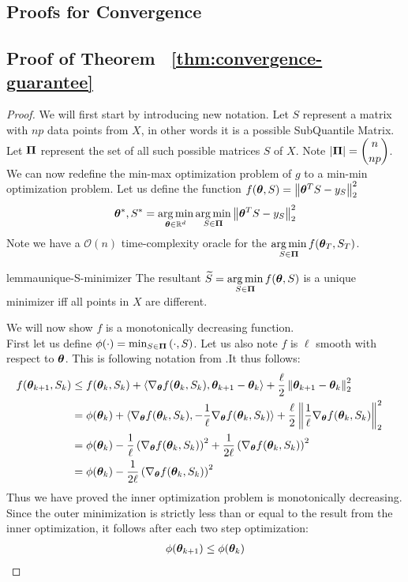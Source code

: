 \documentclass{article} %
\newcommand{\norm}[1]{\left\lVert#1\right\rVert}
\begin{document}
\begin{appendices}
	\newpage
	
	\section{Proofs for Convergence}
	\label{app:convergence-proofs}
	\subsection{Proof of Theorem ~\ref{thm:convergence-guarantee}}
	\begin{proof}
	We will first start by introducing new notation. Let $S$ represent a matrix with $np$ data points from $X$, in other words it is a possible SubQuantile Matrix. Let $\displaystyle{\bm{\Pi}}$ represent the set of all such possible matrices $S$ of $X$. Note $\displaystyle \left|{\bm{\Pi}}\right| = \binom{n}{np}$. We can now redefine the min-max optimization problem of $g$ to a min-min optimization problem. Let us define the function $f(\vtheta, S) = \norm{\vtheta^T S - y_S}_2^2$
	\begin{equation}
		\vtheta^*, S^* = \argmin_{\vtheta \in \mathbb{R}^d} \argmin_{S \in \vPi} \norm{\vtheta^T S - y_S}_2^2
	\end{equation}
	Note we have a $\mathcal{O}(n)$ time-complexity oracle for the $\displaystyle \operatorname*{arg\,min}_{S\in {\bm{\Pi}}}f({\bm{\theta}}_T,S_T)$. 
	\begin{restatable}{lemma}{unique-S-minimizer}
		\label{lem:unique-S-minimizer}
		The resultant $\displaystyle \widetilde{S} = \operatorname*{arg\,min}_{S \in {\bm{\Pi}}} f({\bm{\theta}},S)$ is a unique minimizer iff all points in $X$ are different. 
	\end{restatable}
	We will now show $f$ is a monotonically decreasing function.\\
	First let us define $\phi(\cdot) = \min_{S \in {\bm{\Pi}}}\left(\cdot,S\right)$. 
	Let us also note $f$ is $\ell$ smooth with respect to ${\bm{\theta}}$. This is following notation from \cite{Jin_2019}.It thus follows:
	\begin{align*}
		f(\vtheta_{k+1}, S_k) &\leq f(\vtheta_k, S_k) + \langle\nabla_\vtheta f(\vtheta_k,S_k), \vtheta_{k+1}-\vtheta_k \rangle + \frac{\ell}{2}\norm{\vtheta_{k+1}-\vtheta_k}_2^2 &&\\
		&= \phi(\vtheta_k) + \langle\nabla_\vtheta f(\vtheta_k,S_k), -\frac{1}{\ell}\nabla_\vtheta f(\vtheta_k,S_k)\rangle + \frac{\ell}{2}\norm{\frac{1}{\ell}\nabla_\vtheta f(\vtheta_k,S_k)}_2^2 &&\\
		&= \phi(\vtheta_k) - \frac{1}{\ell}\left(\nabla_\vtheta f(\vtheta_k,S_k)\right)^2 + \frac{1}{2\ell}\left(\nabla_\vtheta f(\vtheta_k,S_k)\right)^2 &&\\
		&= \phi(\vtheta_k) - \frac{1}{2\ell}\left(\nabla_\vtheta f(\vtheta_k,S_k)\right)^2 &&\\
	\end{align*} 
	Thus we have proved the inner optimization problem is monotonically decreasing. Since the outer minimization is strictly less than or equal to the result from the inner optimization, it follows after each two step optimization: 
	\begin{align*}
		\phi({\bm{\theta}}_{k+1}) \leq \phi({\bm{\theta}}_k)
	\end{align*}
	

\end{proof}
\end{appendices}
\end{document}
